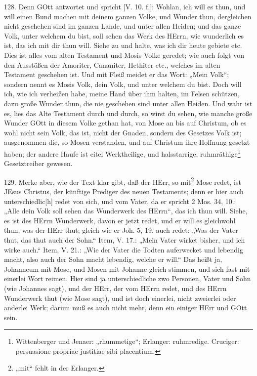 128. Denn GOtt antwortet und spricht [V. 10. f.]: Wohlan, ich will es thun, und will einen Bund machen mit deinem ganzen Volke, und Wunder thun, dergleichen nicht geschehen sind im ganzen Lande, und unter allen Heiden; und das ganze Volk, unter welchem du bist, soll sehen das Werk des HErrn, wie wunderlich es ist, das ich mit dir thun will. Siehe zu und halte, was ich dir heute gebiete etc. Dies ist alles vom alten Testament und Mosis Volke geredet; wie auch folgt von den Ausstößen der Amoriter, Cananiter, Hethiter etc., welches im alten Testament geschehen ist. Und mit Fleiß meidet er das Wort: „Mein Volk“; sondern nennt es Mosis Volk, dein Volk, und unter welchem du bist. Doch will ich, wie ich verheißen habe, meine Hand über ihm halten, im Felsen schützen, dazu große Wunder thun, die nie geschehen sind unter allen Heiden. Und wahr ist es, lies das Alte Testament durch und durch, so wirst du sehen, wie manche große Wunder GOtt in diesem Volke gethan hat, von Mose an bis auf Christum, ob es wohl nicht sein Volk, das ist, nicht der Gnaden, sondern des Gesetzes Volk ist; ausgenommen die, so Mosen verstanden, und auf Christum ihre Hoffnung gesetzt haben; der andere Haufe ist eitel Werktheilige, und halsstarrige, ruhmräthige\footnote{Wittenberger und Jenaer: „rhummetige“; Erlanger: ruhmredige. Cruciger: persuasione propriae justitiae sibi placentium.} Gesetztreiber gewesen.

129. Merke aber, wie der Text klar gibt, daß der HErr, so mit\footnote{„mit“ fehlt in der Erlanger.} Mose redet, ist JEsus Christus, der künftige Prediger des neuen Testaments; denn er hier auch unterschiedlic[h] redet von sich, und vom Vater, da er spricht 2 Mos. 34, 10.: „Alle dein Volk soll sehen das Wunderwerk des HErrn“, das ich thun will. Siehe, es ist des HErrn Wunderwerk, davon er jetzt redet, und er will es gleichwohl thun, was der HErr thut; gleich wie er Joh. 5, 19. auch redet: „Was der Vater thut, das thut auch der Sohn.“ Item, V. 17.: „Mein Vater wirket bisher, und ich wirke auch.“ Item, V. 21.: „Wie der Vater die Todten auferwecket und lebendig macht, also auch der Sohn macht lebendig, welche er will.“ Das heißt ja, Johanneum mit Mose, und Mosen mit Johanne gleich stimmen, und sich fast mit einerlei Wort reimen. Hier sind ja unterschiedliche zwo Personen, Vater und Sohn (wie Johannes
sagt), und der HErr, der vom HErrn redet, und des HErrn Wunderwerk thut (wie Mose sagt), und ist doch einerlei, nicht zweierlei oder anderlei Werk; darum muß es auch nicht mehr, denn ein einiger HErr und GOtt sein.

